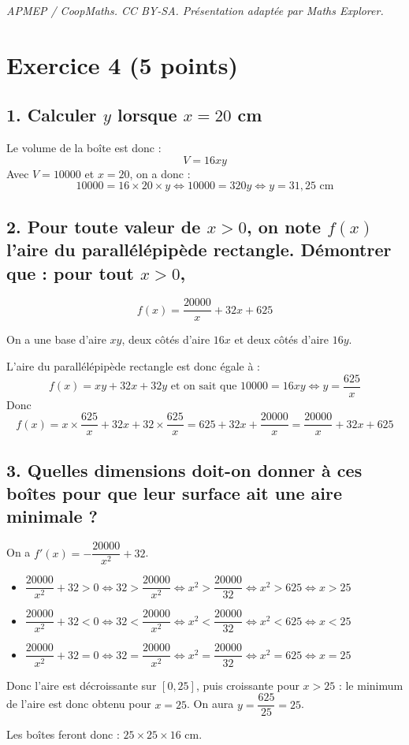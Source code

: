 \documentclass[10pt]{article}
\begin{document}
\noindent\textit{APMEP / CoopMaths. CC BY-SA. Présentation adaptée par Maths Explorer.}\par\medskip
\section*{Exercice 4 (5 points)}
	

	
	\subsection*{1. Calculer $y$ lorsque $x = 20$ cm}
	
	Le volume de la boîte est donc :
	\[
	V = 16xy
	\]
	Avec $V = 10000$ et $x = 20$, on a donc :
	\[
	10000 = 16 \times 20 \times y \iff 10000 = 320y \iff y = 31,25 \text{ cm}
	\]
	
	\subsection*{2. Pour toute valeur de $x > 0$, on note $f(x)$ l’aire du parallélépipède rectangle. Démontrer que : pour tout $x > 0$,}
	\[
	f(x) = \dfrac{20000}{x} + 32x + 625
	\]
	
	On a une base d’aire $xy$, deux côtés d’aire $16x$ et deux côtés d’aire $16y$.
	
	L’aire du parallélépipède rectangle est donc égale à :
	\[
	f(x) = xy + 32x + 32y \text{ et on sait que } 10000 = 16xy \iff y = \dfrac{625}{x}
	\]
	Donc
	\[
	f(x) = x \times \dfrac{625}{x} + 32x + 32 \times \dfrac{625}{x} = 625 + 32x + \dfrac{20000}{x} = \dfrac{20000}{x} + 32x + 625
	\]
	
	\subsection*{3. Quelles dimensions doit-on donner à ces boîtes pour que leur surface ait une aire minimale ?}
	
	On a $f'(x) = -\dfrac{20000}{x^2} + 32$.

	\begin{itemize}
		\item $\dfrac{20000}{x^2} + 32 > 0  \iff 32 > \dfrac{20000}{x^2} \iff x^2 > \dfrac{20000}{32} \iff x^2 > 625 \iff x > 25$
		\item $\dfrac{20000}{x^2} + 32 < 0  \iff 32 < \dfrac{20000}{x^2} \iff x^2 < \dfrac{20000}{32} \iff x^2 < 625 \iff x < 25$
		\item $\dfrac{20000}{x^2} + 32 = 0  \iff 32 = \dfrac{20000}{x^2} \iff x^2 = \dfrac{20000}{32} \iff x^2 = 625 \iff x = 25$
	\end{itemize}

	Donc l’aire est décroissante sur $[0, 25]$, puis croissante pour $x > 25$ : le minimum de l’aire est donc obtenu pour $x = 25$. On aura $y = \dfrac{625}{25} = 25$.
	
	Les boîtes feront donc : $25 \times 25 \times 16$ cm.
\end{document}
